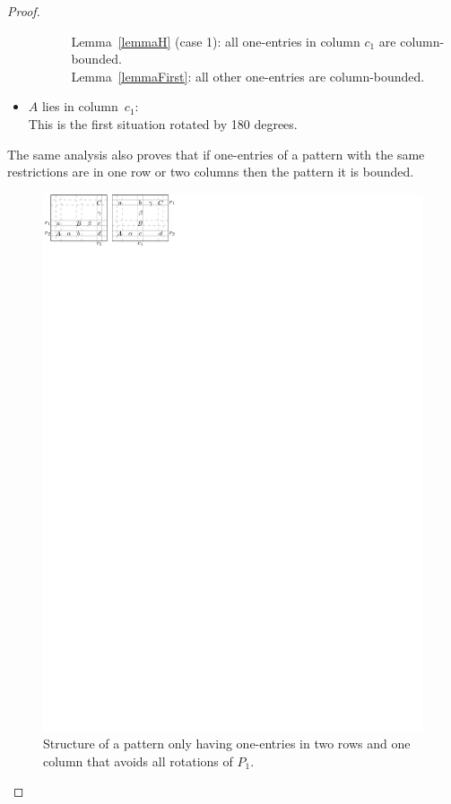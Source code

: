 \begin{proof}
\begin{itemize}
\begin{itemize}
\begin{itemize}
					Lemma~\ref{lemmaH} (case 1): all one-entries in column $c_1$ are column-bounded.\\
					Lemma~\ref{lemmaFirst}: all other one-entries are column-bounded.
			\end{itemize}
	\end{itemize}
\item $A$ lies in column~$c_1$:\\
	This is the first situation rotated by 180 degrees.
\end{itemize}
The same analysis also proves that if one-entries of a pattern with the same restrictions are in one row or two columns then the pattern it is bounded.
\begin{figure}[!ht]
	\centering
	\includegraphics[width=120mm]{img/twoplusone.pdf}
	\caption{Structure of a pattern only having one-entries in two rows and one column that avoids all rotations of $P_1$.}
	\label{twoplusonefig}
\end{figure}
\end{proof}


